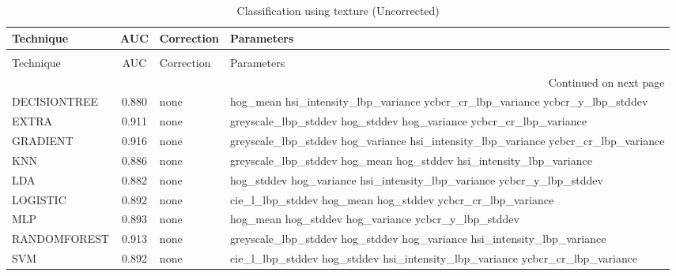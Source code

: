 \begin{longtable}{lcll}
\caption[Classification using texture (Uncorrected)]{Classification using texture (Uncorrected)}
\label{table:texture-uncorrected}\\
\toprule
   Technique &   AUC & Correction &                                                                         Parameters \\
\midrule
\endfirsthead
\caption[]{Classification using texture (Uncorrected)} \\
\toprule
   Technique &   AUC & Correction &                                                                         Parameters \\
\midrule
\endhead
\midrule
\multicolumn{4}{r}{{Continued on next page}} \\
\midrule
\endfoot

\bottomrule
\endlastfoot
DECISIONTREE & 0.880 &       none &       hog\_mean hsi\_intensity\_lbp\_variance ycbcr\_cr\_lbp\_variance ycbcr\_y\_lbp\_stddev \\
       EXTRA & 0.911 &       none &                 greyscale\_lbp\_stddev hog\_stddev hog\_variance ycbcr\_cr\_lbp\_variance \\
    GRADIENT & 0.916 &       none & greyscale\_lbp\_stddev hog\_variance hsi\_intensity\_lbp\_variance ycbcr\_cr\_lbp\_variance \\
         KNN & 0.886 &       none &                greyscale\_lbp\_stddev hog\_mean hog\_stddev hsi\_intensity\_lbp\_variance \\
         LDA & 0.882 &       none &              hog\_stddev hog\_variance hsi\_intensity\_lbp\_variance ycbcr\_y\_lbp\_stddev \\
    LOGISTIC & 0.892 &       none &                         cie\_l\_lbp\_stddev hog\_mean hog\_stddev ycbcr\_cr\_lbp\_variance \\
         MLP & 0.893 &       none &                                hog\_mean hog\_stddev hog\_variance ycbcr\_y\_lbp\_stddev \\
RANDOMFOREST & 0.913 &       none &            greyscale\_lbp\_stddev hog\_stddev hog\_variance hsi\_intensity\_lbp\_variance \\
         SVM & 0.892 &       none &       cie\_l\_lbp\_stddev hog\_stddev hsi\_intensity\_lbp\_variance ycbcr\_cr\_lbp\_variance \\
\end{longtable}
